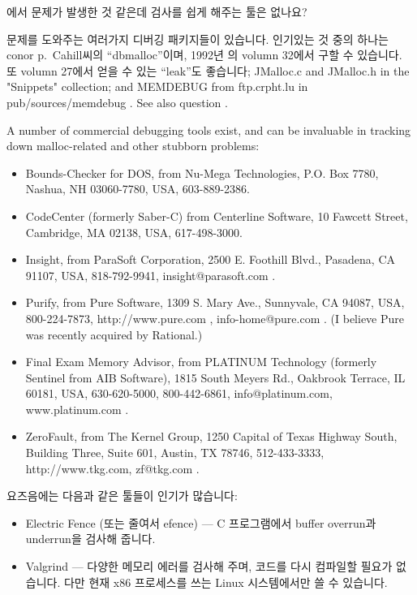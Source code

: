 \begin{faq}
	에서 문제가 발생한 것 같은데 검사를 쉽게 해주는 
	툴은 없나요?

\A
	 문제를 도와주는 여러가지 디버깅 패키지들이 있습니다.
	인기있는 것 중의 하나는 conor p.\ Cahill씨의 ``dbmalloc''이며,
	1992년 의 volumn 32에서 구할 수 있습니다.
	또  volumn 27에서 얻을 수 있는 ``leak''도
	좋습니다; 
	JMalloc.c and JMalloc.h in the "Snippets" collection;
	and MEMDEBUG from ftp.crpht.lu in pub/sources/memdebug .   See
	also question .

	A number of commercial debugging tools exist, and can be
	invaluable in tracking down malloc-related and other stubborn
	problems:

	\begin{itemize}
	\item
		Bounds-Checker for DOS, from Nu-Mega Technologies,
		P.O.  Box 7780, Nashua, NH 03060-7780, USA, 603-889-2386.

	\item
		CodeCenter (formerly Saber-C) from Centerline Software,
		10 Fawcett Street, Cambridge, MA 02138, USA, 617-498-3000.

	\item
		Insight, from ParaSoft Corporation, 2500 E.  Foothill
		Blvd., Pasadena, CA 91107, USA, 818-792-9941,
		insight@parasoft.com .

	\item
		Purify, from Pure Software, 1309 S.  Mary Ave., Sunnyvale,
		CA 94087, USA, 800-224-7873, http://www.pure.com ,
		info-home@pure.com .
		(I believe Pure was recently acquired by Rational.)

	\item
		Final Exam Memory Advisor, from PLATINUM Technology
		(formerly Sentinel from AIB Software), 1815 South Meyers
		Rd., Oakbrook Terrace, IL 60181, USA, 630-620-5000,
		800-442-6861, info@platinum.com, www.platinum.com .

	\item
		ZeroFault, from The Kernel Group, 1250 Capital of Texas
		Highway South, Building Three, Suite 601, Austin,
		TX 78746, 512-433-3333, http://www.tkg.com, zf@tkg.com .
	\end{itemize}

\T
	요즈음에는 다음과 같은 툴들이 인기가 많습니다:
        \begin{itemize}
          \item Electric Fence (또는 줄여서 efence) --- C 프로그램에서
            buffer overrun과 underrun을 검사해 줍니다.
          \item Valgrind --- 다양한 메모리 에러를 검사해 주며, 코드를
            다시 컴파일할 필요가 없습니다. 다만 현재 x86 프로세스를 쓰는
            Linux 시스템에서만 쓸 수 있습니다.
        \end{itemize}
\end{faq}


